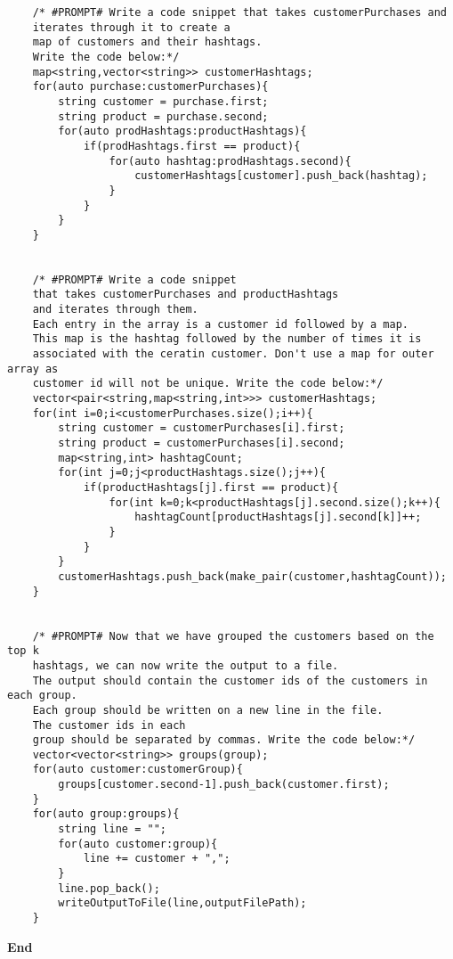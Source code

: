 \documentclass[12pt]{article}
\begin{document}
\begin{verbatim}
    /* #PROMPT# Write a code snippet that takes customerPurchases and 
    iterates through it to create a 
    map of customers and their hashtags. 
    Write the code below:*/
    map<string,vector<string>> customerHashtags;
    for(auto purchase:customerPurchases){
        string customer = purchase.first;
        string product = purchase.second;
        for(auto prodHashtags:productHashtags){
            if(prodHashtags.first == product){
                for(auto hashtag:prodHashtags.second){
                    customerHashtags[customer].push_back(hashtag);
                }
            }
        }
    }


    /* #PROMPT# Write a code snippet 
    that takes customerPurchases and productHashtags 
    and iterates through them. 
    Each entry in the array is a customer id followed by a map. 
    This map is the hashtag followed by the number of times it is 
    associated with the ceratin customer. Don't use a map for outer array as 
    customer id will not be unique. Write the code below:*/
    vector<pair<string,map<string,int>>> customerHashtags;
    for(int i=0;i<customerPurchases.size();i++){
        string customer = customerPurchases[i].first;
        string product = customerPurchases[i].second;
        map<string,int> hashtagCount;
        for(int j=0;j<productHashtags.size();j++){
            if(productHashtags[j].first == product){
                for(int k=0;k<productHashtags[j].second.size();k++){
                    hashtagCount[productHashtags[j].second[k]]++;
                }
            }
        }
        customerHashtags.push_back(make_pair(customer,hashtagCount));
    }


    /* #PROMPT# Now that we have grouped the customers based on the top k 
    hashtags, we can now write the output to a file. 
    The output should contain the customer ids of the customers in each group. 
    Each group should be written on a new line in the file. 
    The customer ids in each 
    group should be separated by commas. Write the code below:*/
    vector<vector<string>> groups(group);
    for(auto customer:customerGroup){
        groups[customer.second-1].push_back(customer.first);
    }
    for(auto group:groups){
        string line = "";
        for(auto customer:group){
            line += customer + ",";
        }
        line.pop_back();
        writeOutputToFile(line,outputFilePath);
    }
\end{verbatim}

\centering
\textbf{End}
\end{document}
